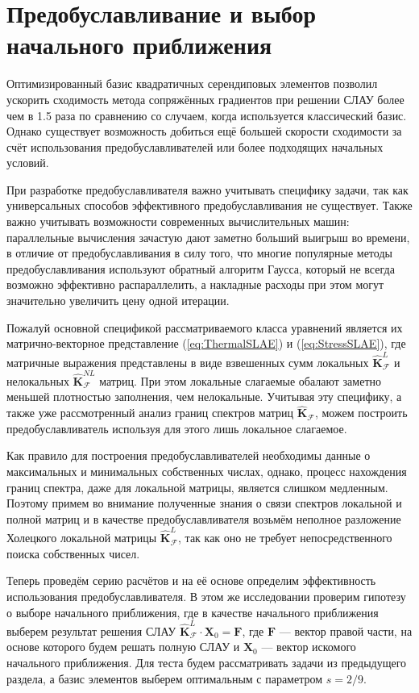 \section{Предобуславливание и выбор начального приближения}\label{sec:NumericalMethods/Preconditioning}

Оптимизированный базис квадратичных серендиповых элементов позволил ускорить сходимость метода сопряжённых градиентов при решении СЛАУ более чем в 1.5 раза по сравнению со случаем, когда используется классический базис. Однако существует возможность добиться ещё большей скорости сходимости за счёт использования предобуславливателей или более подходящих начальных условий.

При разработке предобуславливателя важно учитывать специфику задачи, так как универсальных способов эффективного предобуславливания не существует. Также важно учитывать возможности современных вычислительных машин: параллельные вычисления зачастую дают заметно больший выигрыш во времени, в отличие от предобуславливания в силу того, что многие популярные методы предобуславливания используют обратный алгоритм Гаусса, который не всегда возможно эффективно распараллелить, а накладные расходы при этом могут значительно увеличить цену одной итерации.

Пожалуй основной спецификой рассматриваемого класса уравнений является их матрично-векторное представление (\ref{eq:ThermalSLAE}) и (\ref{eq:StressSLAE}), где матричные выражения представлены в виде взвешенных сумм локальных $\widehat{\textbf{K}}^L_{\mathcal{F}}$ и нелокальных $\widehat{\textbf{K}}^{NL}_{\mathcal{F}}$ матриц. При этом локальные слагаемые обалают заметно меньшей плотностью заполнения, чем нелокальные. Учитывая эту специфику, а также уже рассмотренный анализ границ спектров матриц $\widehat{\textbf{K}}_{\mathcal{F}}$, можем построить предобуславливатель используя для этого лишь локальное слагаемое.

Как правило для построения предобуславливателей необходимы данные о максимальных и минимальных собственных числах, однако, процесс нахождения границ спектра, даже для локальной матрицы, является слишком медленным. Поэтому примем во внимание полученные знания о связи спектров локальной и полной матриц и в качестве предобуславливателя возьмём неполное разложение Холецкого локальной матрицы $\widehat{\textbf{K}}^L_{\mathcal{F}}$, так как оно не требует непосредственного поиска собственных чисел.

Теперь проведём серию расчётов и на её основе определим эффективность использования предобуславливателя. В этом же исследовании проверим гипотезу о выборе начального приближения, где в качестве начального приближения выберем результат решения СЛАУ $\widehat{\textbf{K}}^L_{\mathcal{F}} \cdot \textbf{X}_0 = \textbf{F}$, где $\textbf{F}$ --- вектор правой части, на основе которого будем решать полную СЛАУ и $\textbf{X}_0$ --- вектор искомого начального приближения. Для теста будем рассматривать задачи из предыдущего раздела, а базис элементов выберем оптимальным с параметром $s = 2/9$.

